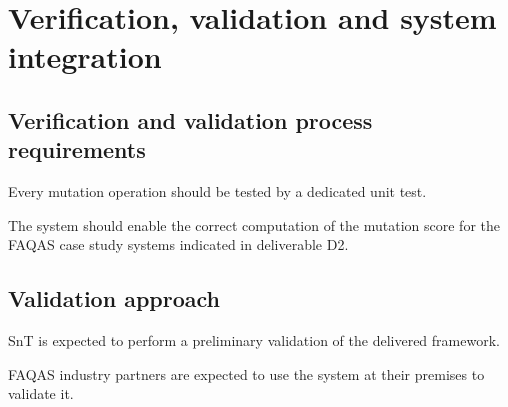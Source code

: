 \section{Verification, validation and system integration}
 \subsection{Verification and validation process requirements}
 
  \RQ{} Every mutation operation should be tested by a dedicated unit test.
  
     \RQ{} The system should enable the correct computation of the mutation score for the FAQAS case study systems indicated in deliverable D2.
     
 \subsection{Validation approach}
 
 \RQ{} SnT is expected to perform a preliminary validation of the delivered framework.

 \RQ{} FAQAS industry partners are expected to use the system at their premises to validate it.
 
 

